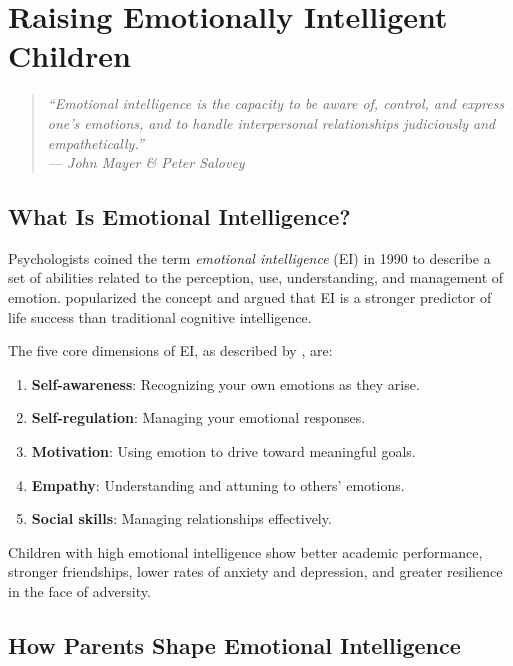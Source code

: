 \chapter{Raising Emotionally Intelligent Children}

\begin{quote}
\itshape ``Emotional intelligence is the capacity to be aware of, control,
and express one's emotions, and to handle interpersonal relationships
judiciously and empathetically.''\\
\upshape --- John Mayer \& Peter Salovey
\end{quote}

\section{What Is Emotional Intelligence?}

Psychologists \citet{salovey1990} coined the term
\textit{emotional intelligence} (EI) in 1990 to describe a set of
abilities related to the perception, use, understanding, and management
of emotion. \citet{goleman1995} popularized the concept and argued that EI
is a stronger predictor of life success than traditional cognitive
intelligence.

The five core dimensions of EI, as described by \citet{goleman1995}, are:

\begin{enumerate}
  \item \textbf{Self-awareness}: Recognizing your own emotions as they
        arise.
  \item \textbf{Self-regulation}: Managing your emotional responses.
  \item \textbf{Motivation}: Using emotion to drive toward meaningful
        goals.
  \item \textbf{Empathy}: Understanding and attuning to others' emotions.
  \item \textbf{Social skills}: Managing relationships effectively.
\end{enumerate}

Children with high emotional intelligence show better academic performance,
stronger friendships, lower rates of anxiety and depression, and greater
resilience in the face of adversity.

\section{How Parents Shape Emotional Intelligence}

